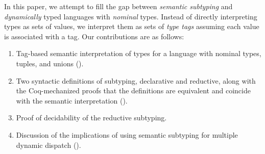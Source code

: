 In this paper, we attempt to fill the gap between \emph{semantic subtyping} and 
\emph{dynamically} typed languages with \emph{nominal} types.
Instead of directly interpreting types as sets of values,
we interpret them as sets of \emph{type tags} assuming 
each value is associated with a tag.
Our contributions are as follows:
\begin{enumerate}
  \item Tag-based semantic interpretation of types for a language
    with nominal types, tuples, and unions ().
  \item Two syntactic definitions of subtyping, declarative and reductive,
    along with the Coq-mechanized proofs that the definitions are equivalent
    and coincide with the semantic interpretation (). 	
  \item Proof of decidability of the reductive subtyping.
  \item Discussion of the implications of using semantic subtyping
    for multiple dynamic dispatch ().
\end{enumerate}






